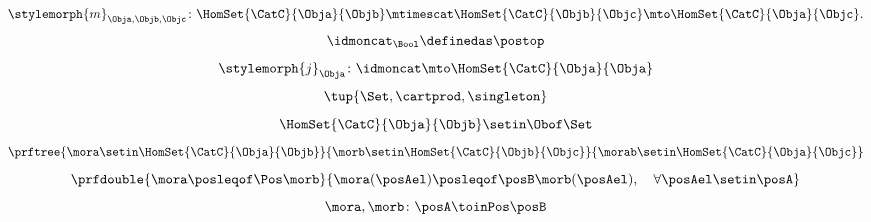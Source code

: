 {\begin{forslides}
        \begin{equation}
            \label{eq:poset_bool_h}
            \stylemorph{m}_{\Obja,\Objb,\Objc}\colon \HomSet{\CatC}{\Obja}{\Objb}\mtimescat \HomSet{\CatC}{\Objb}{\Objc}\mto \HomSet{\CatC}{\Obja}{\Objc}.
        \end{equation}
        \begin{equation}
            \label{eq:poset_bool_i}
            \idmoncat_{\Bool} \definedas \postop
        \end{equation}
        \begin{equation}
            \label{eq:poset_bool_k}
            \stylemorph{j}_\Obja\colon \idmoncat \mto \HomSet{\CatC}{\Obja}{\Obja}
        \end{equation}
        \begin{equation}
            \label{eq:poset_bool_j}
            \tup{\Set, \cartprod, \singleton}
        \end{equation}
        \begin{equation}
            \label{eq:poset_bool_l}
            \HomSet{\CatC}{\Obja}{\Objb}\setin \Obof\Set
        \end{equation}
        \begin{equation}
            \label{eq:poset_bool_m}
            \prftree{\mora \setin \HomSet{\CatC}{\Obja}{\Objb}}{\morb \setin \HomSet{\CatC}{\Objb}{\Objc}}{{\morab \setin \HomSet{\CatC}{\Obja}{\Objc}}}
        \end{equation}
        \begin{equation}
            \label{eq:poset_pos_a}
            \prfdouble{
                \mora \posleqof\Pos \morb}{\mora(\posAel)\posleqof\posB \morb(\posAel), \quad \forall \posAel \setin \posA}
        \end{equation}
        \begin{equation}
            \label{eq:poset_pos_b}
            \mora,\morb\colon \posA\toinPos \posB
        \end{equation}


\end{forslides}}
